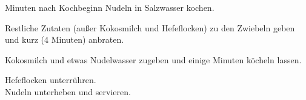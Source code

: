 \begin{recipe}
{     Minuten nach Kochbeginn Nudeln in Salzwasser kochen.
    
    \step%
    Restliche Zutaten (außer Kokosmilch und Hefeflocken) zu den Zwiebeln geben und kurz (4 Minuten) anbraten.
    
    \step%
    Kokosmilch und etwas Nudelwasser zugeben und einige Minuten köcheln lassen.
    
    \step%
    Hefeflocken unterrühren.\\
    
    \step%
    Nudeln unterheben und servieren.
}


\end{recipe}